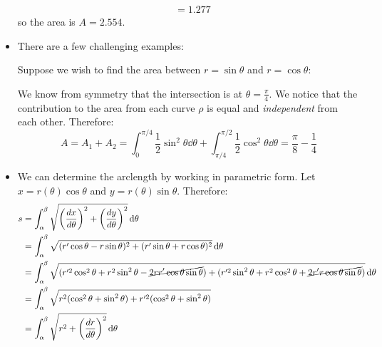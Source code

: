 \begin{itemize}
\begin{example}
\begin{align}
            &= 1.277
        \end{align}
        so the area is $A=2.554$.
    \end{example}
    \item There are a few challenging examples:
    \begin{example}
        Suppose we wish to find the area between $r=\sin\theta$ and $r=\cos \theta$:
        \begin{center}
        \end{center}
        We know from symmetry that the intersection is at $\theta = \frac{\pi}{4}$. We notice that the contribution to the area from each curve $\rho$ is equal and \textit{independent} from each other. Therefore:
        \begin{equation}
            A = A_1 + A_2 = \int_0^{\pi/4} \frac{1}{2}\sin^2\theta \dd{\theta} + \int_{\pi/4}^{\pi/2} \frac{1}{2}\cos^2\theta \dd{\theta} = \frac{\pi}{8} - \frac{1}{4}
        \end{equation}
    \end{example}
    \item We can determine the arclength by working in parametric form. Let $x = r(\theta) \cos\theta$ and $y = r(\theta) \sin\theta$. Therefore:
    \begin{align}
        s &= \int_{\alpha}^{\beta} \sqrt{\left(\frac{dx}{d\theta}\right)^2 + \left(\frac{dy}{d\theta}\right)^2}\dd{\theta} \\ 
        &= \int_\alpha^\beta \sqrt{(r'\cos\theta - r\sin\theta)^2 + (r'\sin\theta + r\cos\theta)^2} \dd{\theta} \\ 
        &= \int_\alpha^\beta \sqrt{(r'^2\cos^2\theta + r^2\sin^2\theta - \cancel{2rr'\cos\theta\sin\theta}) + (r'^2\sin^2\theta + r^2\cos^2\theta + \cancel{2r'r\cos\theta\sin\theta})} \dd{\theta} \\ 
        &= \int_\alpha^\beta \sqrt{r^2(\cos^2\theta+\sin^2\theta) + r'^2(\cos^2\theta+\sin^2\theta)} \\ 
        &= \int_\alpha^\beta \sqrt{r^2 + \left(\frac{dr}{d\theta}\right)^2} \dd{\theta}
    \end{align}

\end{itemize}
